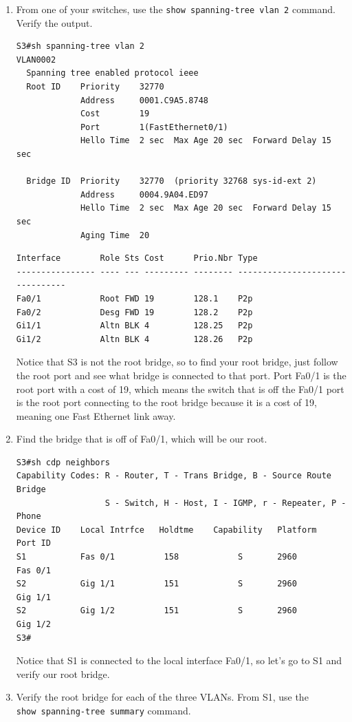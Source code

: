 \begin{enumerate}
\item
  From one of your switches, use the
  \texttt{show\ spanning-tree\ vlan\ 2} command. Verify the output.

\begin{verbatim}
S3#sh spanning-tree vlan 2
VLAN0002
  Spanning tree enabled protocol ieee
  Root ID    Priority    32770
             Address     0001.C9A5.8748
             Cost        19
             Port        1(FastEthernet0/1)
             Hello Time  2 sec  Max Age 20 sec  Forward Delay 15 sec
 
  Bridge ID  Priority    32770  (priority 32768 sys-id-ext 2)
             Address     0004.9A04.ED97
             Hello Time  2 sec  Max Age 20 sec  Forward Delay 15 sec
             Aging Time  20
\end{verbatim}

\begin{verbatim}
Interface        Role Sts Cost      Prio.Nbr Type
---------------- ---- --- --------- -------- --------------------------------
Fa0/1            Root FWD 19        128.1    P2p
Fa0/2            Desg FWD 19        128.2    P2p
Gi1/1            Altn BLK 4         128.25   P2p
Gi1/2            Altn BLK 4         128.26   P2p
\end{verbatim}

  Notice that S3 is not the root bridge, so to find your root bridge,
  just follow the root port and see what bridge is connected to that
  port. Port Fa0/1 is the root port with a cost of 19, which means the
  switch that is off the Fa0/1 port is the root port connecting to the
  root bridge because it is a cost of 19, meaning one Fast Ethernet link
  away.
\item
  Find the bridge that is off of Fa0/1, which will be our root.

\begin{verbatim}
S3#sh cdp neighbors
Capability Codes: R - Router, T - Trans Bridge, B - Source Route Bridge
                  S - Switch, H - Host, I - IGMP, r - Repeater, P - Phone
Device ID    Local Intrfce   Holdtme    Capability   Platform    Port ID
S1           Fas 0/1          158            S       2960        Fas 0/1
S2           Gig 1/1          151            S       2960        Gig 1/1
S2           Gig 1/2          151            S       2960        Gig 1/2
S3#
\end{verbatim}

  Notice that S1 is connected to the local interface Fa0/1, so let's go
  to S1 and verify our root bridge.
\item
  Verify the root bridge for each of the three VLANs. From S1, use the
  \texttt{show\ spanning-tree\ summary} command.


\end{enumerate}
